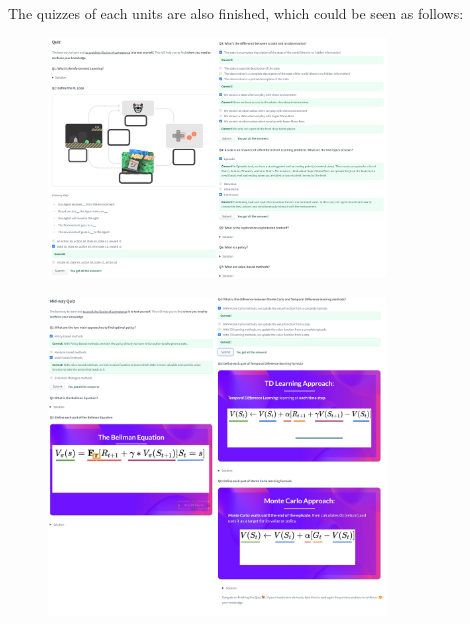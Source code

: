\begin{homeworkProblem}
The quizzes of each units are also finished, which could be seen as follows:
\begin{figure}[H]
    \centering
    \includegraphics[width=0.8\textwidth]{../Img/Huggingface_DRL/unit1_quiz.png}
\end{figure}
\begin{figure}[H]
    \centering
    \includegraphics[width=0.8\textwidth]{../Img/Huggingface_DRL/unit2_midway_quiz.png}
\end{figure}
\begin{figure}[H]
    \centering

\end{figure}
\end{homeworkProblem}
